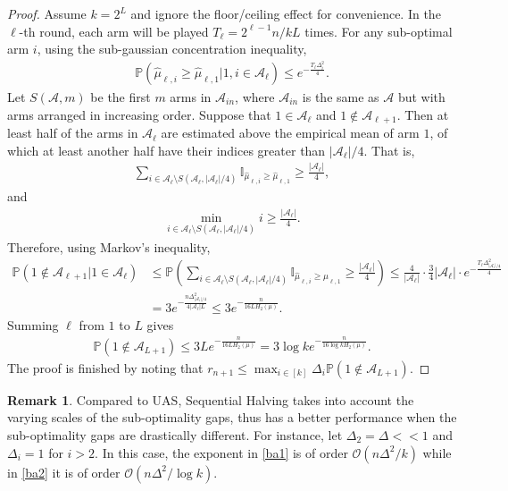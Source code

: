 \documentclass[letterpaper,11pt,openright,openany]{book}
\numberwithin{equation}{section}
\theoremstyle{plain}
\theoremstyle{definition}
\newtheorem{Rem}[Th]{Remark}
\def\P{{\mathbb P}}
\begin{document}
\begin{proof}
Assume $k=2^L$ and ignore the floor/ceiling effect for convenience. In the $\ell$-th round, each arm will be played $T_\ell = 2^{\ell-1}n/kL$ times. For any sub-optimal arm $i$, using the sub-gaussian concentration inequality, 
\begin{align*}
\P\left(\hat{\mu}_{\ell,i}\geq\hat{\mu}_{\ell,1}|1, i\in\mathcal A_\ell\right)\leq e^{-\frac{T_\ell\Delta_i^2}{4}}.
\end{align*}
Let $S(\mathcal A, m)$ be the first $m$ arms in $\mathcal A_{in}$, where $\mathcal A_{in}$ is the same as $\mathcal A$ but with arms arranged in increasing order. 
Suppose that $1\in\mathcal A_\ell$ and $1\notin\mathcal A_{\ell+1}$.  Then at least half of the arms in $\mathcal A_\ell$ are estimated above the empirical mean of arm $1$, of which at least another half have their indices greater than $|\mathcal A_\ell|/4$. That is, 
\begin{align*}
\sum_{i\in\mathcal A_{\ell}\setminus S(\mathcal A_\ell, |\mathcal A_\ell|/4)}\mathbb I_{\hat{\mu}_{\ell, i}\geq \hat{\mu}_{\ell, 1}}\geq\frac{|\mathcal A_\ell |}{4},
\end{align*}
and 
\begin{align*}
\min_{i\in\mathcal A_{\ell}\setminus S(\mathcal A_\ell, |\mathcal A_\ell|/4)}i\geq\frac{|\mathcal A_\ell|}{4}. 
\end{align*}
Therefore, using Markov's inequality, 
\begin{align*}
\P\left(1\notin\mathcal A_{\ell+1}| 1\in\mathcal A_\ell\right)&\leq\P\left(\sum_{i\in\mathcal A_{\ell}\setminus S(\mathcal A_\ell, |\mathcal A_\ell|/4)}\mathbb I_{\hat{\mu}_{\ell, i}\geq \hat{\mu}_{\ell, 1}}\geq\frac{|\mathcal A_\ell |}{4}\right)\leq\frac{4}{|\mathcal A_\ell|}\cdot\frac{3}{4}|\mathcal A_\ell|\cdot e^{-\frac{T_\ell\Delta_{|\mathcal A_i|/4}^2}{4}}\\
& = 3e^{-\frac{n\Delta_{|\mathcal A_i|/4}^2}{4|\mathcal A_\ell|L}}\leq 3e^{-\frac{n}{16LH_2(\mu)}}.
\end{align*}
Summing $\ell$ from $1$ to $L$ gives
\begin{align*}
\P\left(1\notin\mathcal A_{L+1}\right)\leq 3Le^{-\frac{n}{16LH_2(\mu)}} = 3\log ke^{-\frac{n}{16\log kH_2(\mu)}}.
\end{align*}
The proof is finished by noting that $r_{n+1}\leq\max_{i\in [k]}\Delta_i\P\left(1\notin\mathcal A_{L+1}\right)$. 
\end{proof}
\begin{Rem}
Compared to UAS, Sequential Halving takes into account the varying scales of the sub-optimality gaps, thus has a better performance when the sub-optimality gaps are drastically different.  For instance, let $\Delta_2=\Delta<<1$ and $\Delta_i=1$ for $i>2$. In this case, the exponent in \eqref{ba1} is of order $\mathcal O(n\Delta^2/k)$ while in \eqref{ba2} it is of order $\mathcal O(n\Delta^2/\log k)$. 
\end{Rem}
\end{document}
